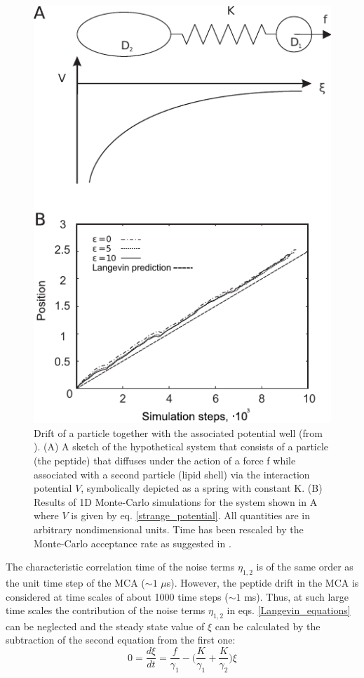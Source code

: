 \begin{figure}[!ht]
\begin{center}
  \includegraphics[scale=1.2]{../figures/langevin_spring.pdf}
\end{center}
 \caption[Drift of a particle together with the associated potential well]{Drift of a particle together with the associated potential well (from \cite{Kiselev2011}). (A) A sketch of the hypothetical system that consists of a particle (the peptide) that diffuses under the action of a force f while associated with a second particle (lipid shell) via the interaction potential $V$, symbolically depicted as a spring with constant K. (B) Results of 1D Monte-Carlo simulations for the system shown in A where $V$ is given by eq. \eqref{strange_potential}. All quantities are in arbitrary nondimensional units. Time has been rescaled by the Monte-Carlo acceptance rate as suggested in \cite{Sanz2010}.}
\label{fig:langevin_spring}
\end{figure}
The characteristic correlation time of the noise terms $\eta_{1,2}$ is of the same order as the unit time step of the MCA ($\sim1$ $\mu$s). However, the peptide drift in the MCA is considered at time scales of about 1000 time steps ($\sim1$ ms). Thus, at such large time scales the contribution of the noise terms $\eta_{1,2}$ in eqs. \eqref{Langevin_equations} can be neglected and the steady state value of $\xi$ can be calculated by the subtraction of the second equation from the first one:
\begin{equation}
\label{Langevin_subtraction}
 0 = \frac{d\xi}{dt} = \frac{f}{\gamma_1} - \Big(\frac{K}{\gamma_1} + \frac{K}{\gamma_2}\Big)\xi
\end{equation}

